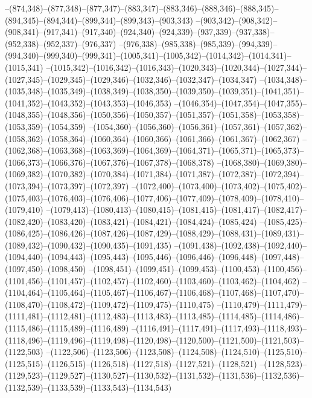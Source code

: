 --(874,348)--(877,348)--(877,347)--(883,347)--(883,346)--(888,346)--(888,345)--(894,345)--(894,344)--(899,344)--(899,343)--(903,343)
--(903,342)--(908,342)--(908,341)--(917,341)--(917,340)--(924,340)--(924,339)--(937,339)--(937,338)--(952,338)--(952,337)--(976,337)
--(976,338)--(985,338)--(985,339)--(994,339)--(994,340)--(999,340)--(999,341)--(1005,341)--(1005,342)--(1014,342)--(1014,341)--(1015,341)
--(1015,342)--(1016,342)--(1016,343)--(1020,343)--(1020,344)--(1027,344)--(1027,345)--(1029,345)--(1029,346)--(1032,346)--(1032,347)--(1034,347)
--(1034,348)--(1035,348)--(1035,349)--(1038,349)--(1038,350)--(1039,350)--(1039,351)--(1041,351)--(1041,352)--(1043,352)--(1043,353)--(1046,353)
--(1046,354)--(1047,354)--(1047,355)--(1048,355)--(1048,356)--(1050,356)--(1050,357)--(1051,357)--(1051,358)--(1053,358)--(1053,359)--(1054,359)
--(1054,360)--(1056,360)--(1056,361)--(1057,361)--(1057,362)--(1058,362)--(1058,364)--(1060,364)--(1060,366)--(1061,366)--(1061,367)--(1062,367)
--(1062,368)--(1063,368)--(1063,369)--(1064,369)--(1064,371)--(1065,371)--(1065,373)--(1066,373)--(1066,376)--(1067,376)--(1067,378)--(1068,378)
--(1068,380)--(1069,380)--(1069,382)--(1070,382)--(1070,384)--(1071,384)--(1071,387)--(1072,387)--(1072,394)--(1073,394)--(1073,397)--(1072,397)
--(1072,400)--(1073,400)--(1073,402)--(1075,402)--(1075,403)--(1076,403)--(1076,406)--(1077,406)--(1077,409)--(1078,409)--(1078,410)--(1079,410)
--(1079,413)--(1080,413)--(1080,415)--(1081,415)--(1081,417)--(1082,417)--(1082,420)--(1083,420)--(1083,421)--(1084,421)--(1084,424)--(1085,424)
--(1085,425)--(1086,425)--(1086,426)--(1087,426)--(1087,429)--(1088,429)--(1088,431)--(1089,431)--(1089,432)--(1090,432)--(1090,435)--(1091,435)
--(1091,438)--(1092,438)--(1092,440)--(1094,440)--(1094,443)--(1095,443)--(1095,446)--(1096,446)--(1096,448)--(1097,448)--(1097,450)--(1098,450)
--(1098,451)--(1099,451)--(1099,453)--(1100,453)--(1100,456)--(1101,456)--(1101,457)--(1102,457)--(1102,460)--(1103,460)--(1103,462)--(1104,462)
--(1104,464)--(1105,464)--(1105,467)--(1106,467)--(1106,468)--(1107,468)--(1107,470)--(1108,470)--(1108,472)--(1109,472)--(1109,475)--(1110,475)
--(1110,479)--(1111,479)--(1111,481)--(1112,481)--(1112,483)--(1113,483)--(1113,485)--(1114,485)--(1114,486)--(1115,486)--(1115,489)--(1116,489)
--(1116,491)--(1117,491)--(1117,493)--(1118,493)--(1118,496)--(1119,496)--(1119,498)--(1120,498)--(1120,500)--(1121,500)--(1121,503)--(1122,503)
--(1122,506)--(1123,506)--(1123,508)--(1124,508)--(1124,510)--(1125,510)--(1125,515)--(1126,515)--(1126,518)--(1127,518)--(1127,521)--(1128,521)
--(1128,523)--(1129,523)--(1129,527)--(1130,527)--(1130,532)--(1131,532)--(1131,536)--(1132,536)--(1132,539)--(1133,539)--(1133,543)--(1134,543)
